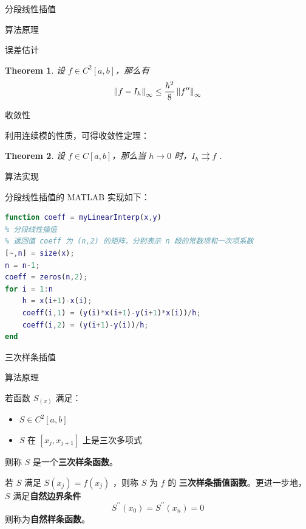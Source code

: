 \documentclass[a4paper]{article}
\newtheorem{myThm}{Theorem}
\begin{document}
\begin{multicols}{2}
\begin{section}{分段线性插值}
\begin{subsection}{算法原理}
\begin{subsubsection}{误差估计}
\begin{myThm}
				设 $f\in C^2[a,b]$，那么有 $$\left\|f-I_h\right\|_{\infty} \leq {h^2\over 8} \left\|f^{\prime \prime}\right\|_{\infty}$$
				
			\end{myThm}
			
		\end{subsubsection}
		
		\begin{subsubsection}{收敛性}
			
			利用连续模的性质，可得收敛性定理：
			
			\begin{myThm}
				
				设 $f\in C[a,b]$，那么当 $h \rightarrow 0$ 时，$I_{h} \rightrightarrows f$ .
				
			\end{myThm}

				
		\end{subsubsection}

		
	\end{subsection}

	\begin{subsection}{算法实现}
		
		分段线性插值的 MATLAB 实现如下：
		
		\begin{lstlisting}[language=Matlab]
function coeff = myLinearInterp(x,y)
% 分段线性插值
% 返回值 coeff 为 (n,2) 的矩阵，分别表示 n 段的常数项和一次项系数
[~,n] = size(x);
n = n-1;
coeff = zeros(n,2);
for i = 1:n
    h = x(i+1)-x(i);
    coeff(i,1) = (y(i)*x(i+1)-y(i+1)*x(i))/h;
    coeff(i,2) = (y(i+1)-y(i))/h;
end
		\end{lstlisting}
		
	\end{subsection}
	
\end{section}

\begin{section}{三次样条插值}
	
	\begin{subsection}{算法原理}
		
		若函数 $S_(x)$ 满足：
		
		\begin{itemize}
			\item $S\in C^2[a,b]$
			\item $S$ 在 $[x_j,x_{j+1}]$ 上是三次多项式 
		\end{itemize} 
		则称 $S$ 是一个\textbf{三次样条函数}。
		
		若 $S$ 满足 $S(x_j) = f(x_j)$ ，则称 $S$ 为 $f$ 的 \textbf{三次样条插值函数}。更进一步地，$S$ 满足\textbf{自然边界条件} $$S^{\prime\prime}(x_0) = S^{\prime\prime}(x_n) = 0$$ 则称为\textbf{自然样条函数}。


\end{subsection}
\end{section}
\end{multicols}
\end{document}

